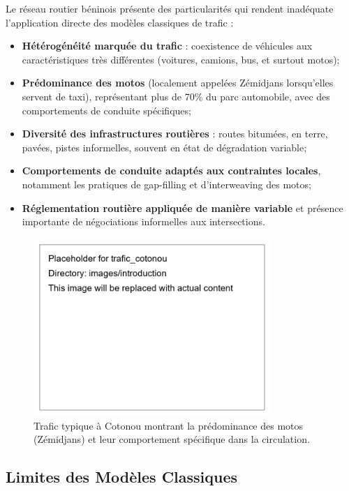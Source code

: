 Le réseau routier béninois présente des particularités qui rendent inadéquate l'application directe des modèles classiques de trafic :

\begin{itemize}
\item \textbf{Hétérogénéité marquée du trafic} : coexistence de véhicules aux caractéristiques très différentes (voitures, camions, bus, et surtout motos);
\item \textbf{Prédominance des motos} (localement appelées Zémidjans lorsqu'elles servent de taxi), représentant plus de 70\% du parc automobile, avec des comportements de conduite spécifiques;
\item \textbf{Diversité des infrastructures routières} : routes bitumées, en terre, pavées, pistes informelles, souvent en état de dégradation variable;
\item \textbf{Comportements de conduite adaptés aux contraintes locales}, notamment les pratiques de gap-filling et d'interweaving des motos;
\item \textbf{Réglementation routière appliquée de manière variable} et présence importante de négociations informelles aux intersections.
\end{itemize}

\begin{figure}[htbp]
\centering
\includegraphics[width=0.8\textwidth]{images/introduction/traffic_cotonou.jpg}
\caption{Trafic typique à Cotonou montrant la prédominance des motos (Zémidjans) et leur comportement spécifique dans la circulation.}\label{fig:trafic_cotonou}
\end{figure}


\subsection{Limites des Modèles Classiques}
\label{subsec:limites_modeles}

